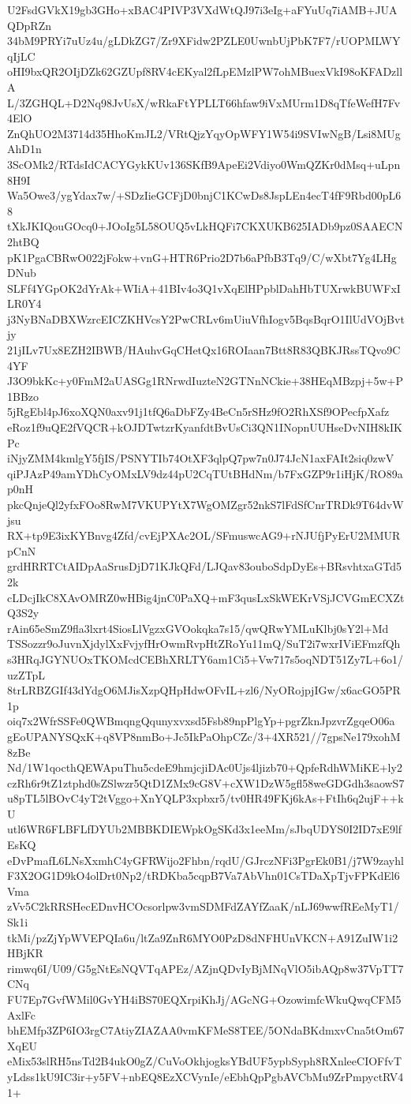 U2FsdGVkX19gb3GHo+xBAC4PIVP3VXdWtQJ97i3eIg+aFYuUq7iAMB+JUAQDpRZn
34bM9PRYi7uUz4u/gLDkZG7/Zr9XFidw2PZLE0UwnbUjPbK7F7/rUOPMLWYqIjLC
oHI9bxQR2OIjDZk62GZUpf8RV4cEKyal2fLpEMzlPW7ohMBuexVkI98oKFADzllA
L/3ZGHQL+D2Nq98JvUsX/wRkaFtYPLLT66hfaw9iVxMUrm1D8qTfeWefH7Fv4ElO
ZnQhUO2M3714d35HhoKmJL2/VRtQjzYqyOpWFY1W54i9SVIwNgB/Lsi8MUgAhD1n
3ScOMk2/RTdsIdCACYGykKUv136SKfB9ApeEi2Vdiyo0WmQZKr0dMsq+uLpn8H9I
Wa5Owe3/ygYdax7w/+SDzIieGCFjD0bnjC1KCwDs8JspLEn4ecT4fF9Rbd00pL68
tXkJKIQouGOcq0+JOoIg5L58OUQ5vLkHQFi7CKXUKB625IADb9pz0SAAECN2htBQ
pK1PgaCBRwO022jFokw+vnG+HTR6Prio2D7b6aPfbB3Tq9/C/wXbt7Yg4LHgDNub
SLFf4YGpOK2dYrAk+WIiA+41BIv4o3Q1vXqElHPpblDahHbTUXrwkBUWFxILR0Y4
j3NyBNaDBXWzrcEICZKHVcsY2PwCRLv6mUiuVfhIogv5BqsBqrO1IlUdVOjBvtjy
21jILv7Ux8EZH2IBWB/HAuhvGqCHetQx16ROIaan7Btt8R83QBKJRssTQvo9C4YF
J3O9bkKc+y0FmM2aUASGg1RNrwdIuzteN2GTNnNCkie+38HEqMBzpj+5w+P1BBzo
5jRgEbl4pJ6xoXQN0axv91j1tfQ6aDbFZy4BeCn5rSHz9fO2RhXSf9OPecfpXafz
eRoz1f9uQE2fVQCR+kOJDTwtzrKyanfdtBvUsCi3QN1INopnUUHseDvNIH8kIKPc
iNjyZMM4kmlgY5fjIS/PSNYTIb74OtXF3qlpQ7pw7n0J74JcN1axFAIt2siq0zwV
qiPJAzP49amYDhCyOMxLV9dz44pU2CqTUtBHdNm/b7FxGZP9r1iHjK/RO89ap0nH
pkcQnjeQl2yfxFOo8RwM7VKUPYtX7WgOMZgr52nkS7lFdSfCnrTRDk9T64dvWjsu
RX+tp9E3ixKYBnvg4Zfd/cvEjPXAc2OL/SFmuswcAG9+rNJUfjPyErU2MMURpCnN
grdHRRTCtAIDpAaSrusDjD71KJkQFd/LJQav83ouboSdpDyEs+BRsvhtxaGTd52k
cLDcjIkC8XAvOMRZ0wHBig4jnC0PaXQ+mF3qusLxSkWEKrVSjJCVGmECXZtQ3S2y
rAin65eSmZ9fla3lxrt4SiosLlVgzxGVOokqka7s15/qwQRwYMLuKlbj0sY2l+Md
TSSozzr9oJuvnXjdylXxFvjyfHrOwmRvpHtZRoYu11mQ/SuT2i7wxrIViEFmzfQh
s3HRqJGYNUOxTKOMcdCEBhXRLTY6am1Ci5+Vw717s5oqNDT51Zy7L+6o1/uzZTpL
8trLRBZGIf43dYdgO6MJisXzpQHpHdwOFvIL+zl6/NyORojpjIGw/x6acGO5PR1p
oiq7x2WfrSSFe0QWBmqngQqunyxvxsd5Fsb89npPlgYp+pgrZknJpzvrZgqeO06a
gEoUPANYSQxK+q8VP8nmBo+Jc5IkPaOhpCZc/3+4XR521//7gpsNe179xohM8zBe
Nd/1W1qocthQEWApuThu5cdeE9hmjcjiDAc0Ujs4ljizb70+QpfeRdhWMiKE+ly2
czRh6r9tZ1ztphd0sZSlwzr5QtD1ZMx9cG8V+cXW1DzW5gfl58weGDGdh3saowS7
u8pTL5lBOvC4yT2tVggo+XnYQLP3xpbxr5/tv0HR49FKj6kAs+FtIh6q2ujF++kU
utl6WR6FLBFLfDYUb2MBBKDIEWpkOgSKd3x1eeMm/sJbqUDYS0I2ID7xE9lfEsKQ
eDvPmafL6LNsXxmhC4yGFRWijo2Fhbn/rqdU/GJrczNFi3PgrEk0B1/j7W9zayhl
F3X2OG1D9kO4olDrt0Np2/tRDKba5cqpB7Va7AbVhn01CsTDaXpTjvFPKdEl6Vma
zVv5C2kRRSHecEDnvHCOcsorlpw3vmSDMFdZAYfZaaK/nLJ69wwfREeMyT1/Sk1i
tkMi/pzZjYpWVEPQIa6u/ltZa9ZnR6MYO0PzD8dNFHUnVKCN+A91ZuIW1i2HBjKR
rimwq6I/U09/G5gNtEsNQVTqAPEz/AZjnQDvIyBjMNqVlO5ibAQp8w37VpTT7CNq
FU7Ep7GvfWMil0GvYH4iBS70EQXrpiKhJj/AGcNG+OzowimfcWkuQwqCFM5AxlFc
bhEMfp3ZP6IO3rgC7AtiyZIAZAA0vmKFMeS8TEE/5ONdaBKdmxvCna5tOm67XqEU
eMix53slRH5nsTd2B4ukO0gZ/CuVoOkhjogksYBdUF5ypbSyph8RXnleeCIOFfvT
yLdss1kU9IC3ir+y5FV+nbEQ8EzXCVynIe/eEbhQpPgbAVCbMu9ZrPmpyctRV41+
